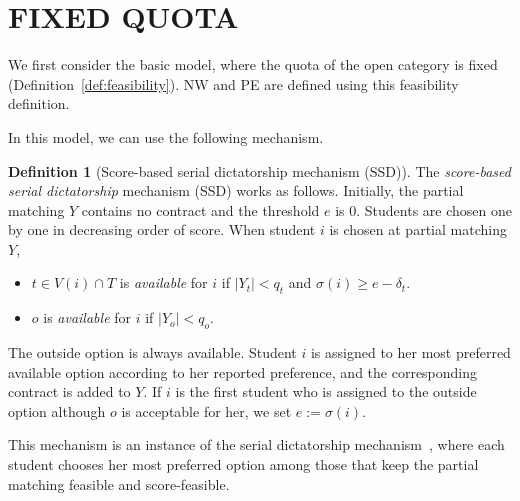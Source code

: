 \documentclass[a4paper,twoside]{article}
\theoremstyle{definition}
\newtheorem{definition}{Definition}
\begin{document}
\section{\uppercase{Fixed Quota}}
\label{sec:fixed}
We first consider the basic model, where the quota of the open category is 
fixed (Definition~\ref{def:feasibility}).
NW and PE are defined using this feasibility definition.

In this model, we can use the following mechanism. 
\begin{definition}[Score-based serial dictatorship mechanism (SSD)]
\label{def:ssd}
The \emph{score-based serial dictatorship} mechanism (SSD) works as follows.
Initially, the partial matching $Y$ contains no contract and the threshold $e$ is $0$.
Students are chosen one by one in decreasing order of score.
When student $i$ is chosen at partial matching $Y$,
\begin{itemize}
\item $t\in V(i)\cap T$ is \emph{available} for $i$ if $|Y_t|<q_t$ and
$\sigma(i)\ge e-\delta_t$.
\item $o$ is \emph{available} for $i$ if $|Y_o|<q_o$.
\end{itemize}
The outside option is always available.
Student $i$ is assigned to her most preferred available option according to her reported
preference, and the corresponding contract is added to $Y$.
If $i$ is the first student who is assigned to the outside option although $o$ is
acceptable for her, we set $e:=\sigma(i)$.
\end{definition}
This mechanism is an instance of the serial dictatorship mechanism~\cite{Sven99a,AbSo98a,GKK+17a}, 
where each student chooses her most preferred option among those that keep
the partial matching feasible and score-feasible.
\end{document}
